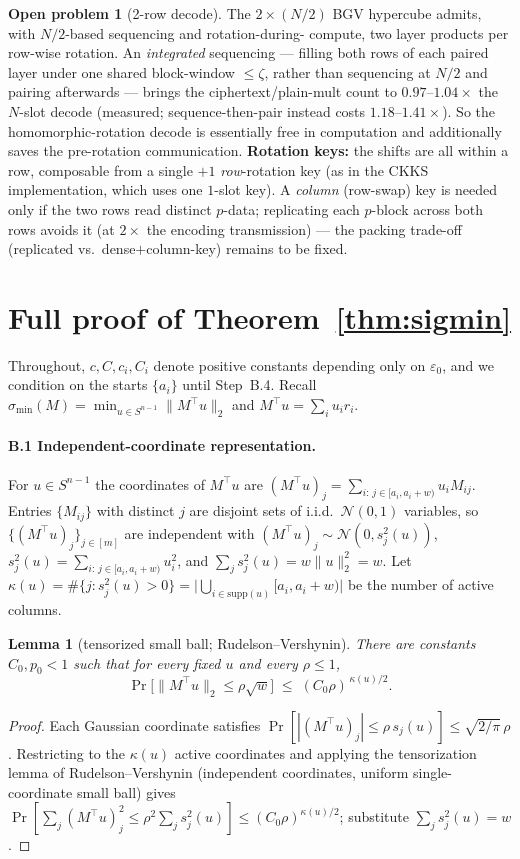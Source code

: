 \documentclass[11pt]{article}
\newcommand{\norm}[1]{\lVert #1 \rVert}
\newcommand{\sigmin}{\sigma_{\min}}
\theoremstyle{plain}
\newtheorem{lemma}{Lemma}
\theoremstyle{definition}
\newtheorem{problem}{Open problem}
\begin{document}
\begin{problem}[2-row decode]
The $2\times(N/2)$ BGV hypercube admits, with $N/2$-based sequencing and rotation-during-
compute, two layer products per row-wise rotation. An \emph{integrated} sequencing --- filling
both rows of each paired layer under one shared block-window $\le\zeta$, rather than sequencing
at $N/2$ and pairing afterwards --- brings the ciphertext/plain-mult count to
$0.97$--$1.04\times$ the $N$-slot decode (measured; sequence-then-pair instead costs
$1.18$--$1.41\times$). So the homomorphic-rotation decode is essentially free in computation and
additionally saves the pre-rotation communication. \textbf{Rotation keys:} the shifts are all
within a row, composable from a single $+1$ \emph{row}-rotation key (as in the CKKS
implementation, which uses one $1$-slot key). A \emph{column} (row-swap) key is needed only if
the two rows read distinct $p$-data; replicating each $p$-block across both rows avoids it (at
$2\times$ the encoding transmission) --- the packing trade-off (replicated vs.\ dense$+$column-key)
remains to be fixed.
\end{problem}

\appendix
\section{Full proof of Theorem~\ref{thm:sigmin}}\label{app:proof}

Throughout, $c,C,c_i,C_i$ denote positive constants depending only on $\varepsilon_0$, and we
condition on the starts $\{a_i\}$ until Step~B.4. Recall $\sigmin(M)=\min_{u\in S^{n-1}}\norm{M^\top u}_2$ and $M^\top u=\sum_i u_i r_i$.

\paragraph{B.1 Independent-coordinate representation.}
For $u\in S^{n-1}$ the coordinates of $M^\top u$ are
$(M^\top u)_j=\sum_{i:\,j\in[a_i,a_i+w)}u_i M_{ij}$. Entries $\{M_{ij}\}$ with distinct $j$ are
disjoint sets of i.i.d.\ $\mathcal N(0,1)$ variables, so $\{(M^\top u)_j\}_{j\in[m]}$ are
independent with $(M^\top u)_j\sim\mathcal N(0,s_j^2(u))$,
$s_j^2(u)=\sum_{i:\,j\in[a_i,a_i+w)}u_i^2$, and $\sum_{j}s_j^2(u)=w\norm u_2^2=w$. Let
$\kappa(u)=\#\{j:s_j^2(u)>0\}=\big|\bigcup_{i\in\mathrm{supp}(u)}[a_i,a_i+w)\big|$ be the
number of active columns.

\begin{lemma}[tensorized small ball; Rudelson--Vershynin]\label{lem:tensor}
There are constants $C_0,p_0<1$ such that for every fixed $u$ and every $\rho\le 1$,
\[
  \Pr\big[\norm{M^\top u}_2 \le \rho\sqrt w\big]\;\le\;(C_0\rho)^{\,\kappa(u)/2}.
\]
\end{lemma}
\begin{proof}[Proof]
Each Gaussian coordinate satisfies $\Pr[|(M^\top u)_j|\le \rho\, s_j(u)]\le \sqrt{2/\pi}\,\rho$.
Restricting to the $\kappa(u)$ active coordinates and applying the tensorization lemma of
Rudelson--Vershynin (independent coordinates, uniform single-coordinate small ball) gives
$\Pr[\sum_{j}(M^\top u)_j^2\le \rho^2\sum_j s_j^2(u)]\le (C_0\rho)^{\kappa(u)/2}$; substitute
$\sum_j s_j^2(u)=w$.
\end{proof}
\end{document}
